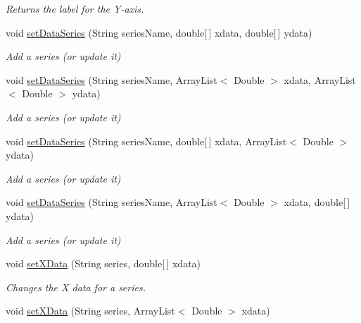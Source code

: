 \begin{DoxyCompactItemize}
\begin{DoxyCompactList}\small\item\em Returns the label for the Y-\/axis. \end{DoxyCompactList}\item 
void \hyperlink{classbridges_1_1base_1_1_line_chart_a586e9953b13e51ab9e592acfb034887b}{set\+Data\+Series} (String series\+Name, double\mbox{[}$\,$\mbox{]} xdata, double\mbox{[}$\,$\mbox{]} ydata)
\begin{DoxyCompactList}\small\item\em Add a series (or update it) \end{DoxyCompactList}\item 
void \hyperlink{classbridges_1_1base_1_1_line_chart_ab3b577798d421da8d8519d73dcf7ceaf}{set\+Data\+Series} (String series\+Name, Array\+List$<$ Double $>$ xdata, Array\+List$<$ Double $>$ ydata)
\begin{DoxyCompactList}\small\item\em Add a series (or update it) \end{DoxyCompactList}\item 
void \hyperlink{classbridges_1_1base_1_1_line_chart_ac650a150cfbf2e572a5ccdb5d25cb00b}{set\+Data\+Series} (String series\+Name, double\mbox{[}$\,$\mbox{]} xdata, Array\+List$<$ Double $>$ ydata)
\begin{DoxyCompactList}\small\item\em Add a series (or update it) \end{DoxyCompactList}\item 
void \hyperlink{classbridges_1_1base_1_1_line_chart_a38eb16930491bc047a5343dd73052219}{set\+Data\+Series} (String series\+Name, Array\+List$<$ Double $>$ xdata, double\mbox{[}$\,$\mbox{]} ydata)
\begin{DoxyCompactList}\small\item\em Add a series (or update it) \end{DoxyCompactList}\item 
void \hyperlink{classbridges_1_1base_1_1_line_chart_a2918179283e8280d47abb43df3c59195}{set\+X\+Data} (String series, double\mbox{[}$\,$\mbox{]} xdata)
\begin{DoxyCompactList}\small\item\em Changes the X data for a series. \end{DoxyCompactList}\item 
void \hyperlink{classbridges_1_1base_1_1_line_chart_a2f141ec46fdafd92fb0d86900a2de46a}{set\+X\+Data} (String series, Array\+List$<$ Double $>$ xdata)

\end{DoxyCompactItemize}
